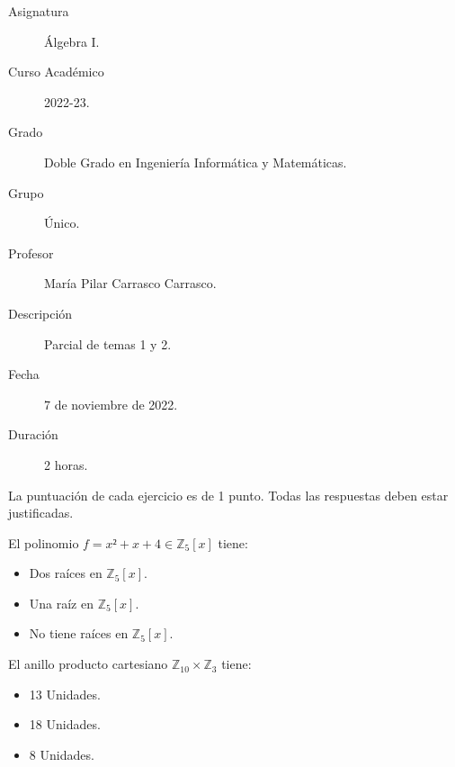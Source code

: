 \documentclass[12pt]{article}
\newcounter{ejercicio}[section] %
\newcounter{ejercicio}
\begin{document}

    
    

    
    \begin{description}
        \item[Asignatura] Álgebra I.
        \item[Curso Académico] 2022-23.
        \item[Grado] Doble Grado en Ingeniería Informática y Matemáticas.
        \item[Grupo] Único.
        \item[Profesor] María Pilar Carrasco Carrasco.
        \item[Descripción] Parcial de temas 1 y 2.
        \item[Fecha] 7 de noviembre de 2022.
        \item[Duración] 2 horas.
    
    \end{description}
    \newpage
    
    \noindent
    La puntuación de cada ejercicio es de 1 punto.\newline
    Todas las respuestas deben estar justificadas.

    \begin{ejercicio}
        El polinomio $f = x² + x + 4 \in \mathbb{Z}_5[x]$ tiene:
        \begin{itemize}
            \item Dos raíces en $\mathbb{Z}_5[x]$.
            \item Una raíz en $\mathbb{Z}_5[x]$.
            \item No tiene raíces en $\mathbb{Z}_5[x]$.
        \end{itemize}
    \end{ejercicio}

    \begin{ejercicio}
        El anillo producto cartesiano $\mathbb{Z}_{10} \times \mathbb{Z}_3$ tiene:
        \begin{itemize}
            \item 13 Unidades.
            \item 18 Unidades.
            \item 8 Unidades.
        \end{itemize}
    \end{ejercicio}
\end{document}
